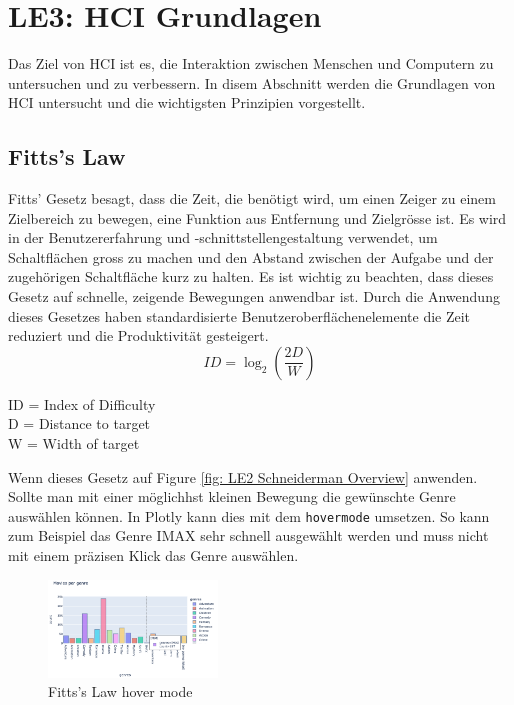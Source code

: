 \documentclass{article}
\begin{document}
\newpage
\section{LE3: HCI Grundlagen}
Das Ziel von HCI ist es, die Interaktion zwischen Menschen und Computern zu untersuchen und zu verbessern.
In disem Abschnitt werden die Grundlagen von HCI untersucht und die wichtigsten Prinzipien vorgestellt.

\subsection{Fitts's Law}
\noindent
Fitts' Gesetz besagt, dass die Zeit, die benötigt wird, um einen Zeiger zu einem Zielbereich zu bewegen,
 eine Funktion aus Entfernung und Zielgrösse ist. Es wird in der Benutzererfahrung und -schnittstellengestaltung
  verwendet, um Schaltflächen gross zu machen und den Abstand zwischen der Aufgabe und der zugehörigen 
  Schaltfläche kurz zu halten. Es ist wichtig zu beachten, dass dieses Gesetz auf schnelle, 
  zeigende Bewegungen anwendbar ist. Durch die Anwendung dieses Gesetzes haben standardisierte 
  Benutzeroberflächenelemente die Zeit reduziert und die Produktivität gesteigert.\cite{noauthor_what_nodate}
\\
\begin{equation}
ID = \log_2\left(\frac{2D}{W}\right)
\end{equation}
\begin{center}
ID = Index of Difficulty\\
D = Distance to target\\
W = Width of target\\    
\end{center}

\noindent
Wenn dieses Gesetz auf Figure \ref{fig: LE2 Schneiderman Overview} anwenden. Sollte man mit einer möglichhst kleinen Bewegung die gewünschte Genre auswählen können.
In Plotly kann dies mit dem \texttt{hovermode} umsetzen. So kann zum Beispiel das Genre IMAX sehr schnell ausgewählt werden und muss nicht mit einem präzisen Klick das Genre auswählen.
\begin{figure}[!h]
\centering
\includegraphics[width=0.4\textwidth]{img/fitts_hover.png}
\caption{\label{fig: LE3 HCI Fitts Law} Fitts's Law hover mode}
\end{figure}
\end{document}
